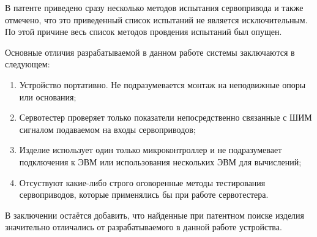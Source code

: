 В патенте приведено сразу несколько методов испытания сервопривода и
также отмечено, что это приведенный список испытаний не является
исключительным. По этой причине весь список методов провдения
испытаний был опущен.

Основные отличия разрабатываемой в данном работе системы заключаются в
следующем:
\begin{enumerate}
\item Устройство портативно. Не подразумевается монтаж на неподвижные опоры или основания;
  
\item Сервотестер проверяет только показатели непосредственно связанные с ШИМ
  сигналом подаваемом на входы сервоприводов;
  
\item Изделие использует один только микроконтроллер и не
  подразумевает подключения к ЭВМ или использования нескольких ЭВМ для вычислений;
  
\item Отсуствуют какие-либо строго оговоренные методы тестирования сервоприводов,
  которые применялись бы при работе сервотестера.
\end{enumerate}

В заключении остаётся добавить, что найденные при патентном поиске
изделия значительно отличались от разрабатываемого в данной работе
устройства.


\newpage


